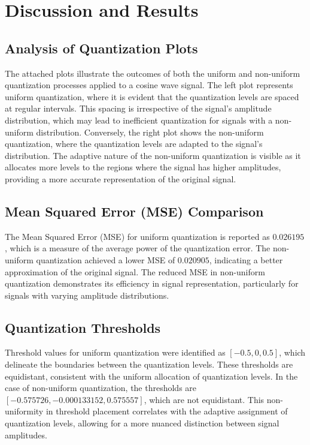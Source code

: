 \documentclass[11pt]{article}
\begin{document}
\section{Discussion and Results}

\subsection{Analysis of Quantization Plots}
The attached plots illustrate the outcomes of both the uniform and non-uniform quantization processes applied to a cosine wave signal. The left plot represents uniform quantization, where it is evident that the quantization levels are spaced at regular intervals. This spacing is irrespective of the signal's amplitude distribution, which may lead to inefficient quantization for signals with a non-uniform distribution. Conversely, the right plot shows the non-uniform quantization, where the quantization levels are adapted to the signal's distribution. The adaptive nature of the non-uniform quantization is visible as it allocates more levels to the regions where the signal has higher amplitudes, providing a more accurate representation of the original signal.

\subsection{Mean Squared Error (MSE) Comparison}
The Mean Squared Error (MSE) for uniform quantization is reported as \(0.026195\), which is a measure of the average power of the quantization error. The non-uniform quantization achieved a lower MSE of \(0.020905\), indicating a better approximation of the original signal. The reduced MSE in non-uniform quantization demonstrates its efficiency in signal representation, particularly for signals with varying amplitude distributions.

\subsection{Quantization Thresholds}
Threshold values for uniform quantization were identified as \([-0.5, 0, 0.5]\), which delineate the boundaries between the quantization levels. These thresholds are equidistant, consistent with the uniform allocation of quantization levels. In the case of non-uniform quantization, the thresholds are \([-0.575726, -0.000133152, 0.575557]\), which are not equidistant. This non-uniformity in threshold placement correlates with the adaptive assignment of quantization levels, allowing for a more nuanced distinction between signal amplitudes.
\end{document}
